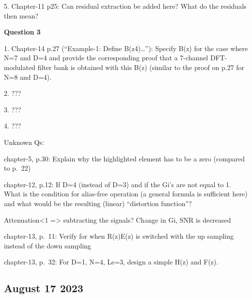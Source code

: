 \documentclass[
  a4paper,
  ,captions=tableheading
]{scrartcl}
\begin{document}
5. Chapter-11 p25: Can residual extraction be added here? What do the
residuals then mean?

\textbf{Question 3}

1. Chapter-14 p.27 (``Example-1: Define B(z4)\ldots''): Specify B(z) for
the case where N=7 and D=4 and provide the corresponding proof that a
7-channel DFT-modulated filter bank is obtained with this B(z) (similar
to the proof on p.27 for N=8 and D=4).

2. ???

3. ???

4. ???

Unknown Qs:

chapter-5, p.30: Explain why the highlighted element has to be a zero
(compared to p.~22)

chapter-12, p.12: If D=4 (instead of D=3) and if the Gi's are not equal
to 1. What is the condition for alias-free operation (a general formula
is sufficient here) and what would be the resulting (linear)
``distortion function''?

Attenuation\textless1 =\textgreater{} subtracting the signals? Change in
Gi, SNR is decreased

chapter-13, p.~11: Verify for when R(z)E(z) is switched with the up
sampling instead of the down sampling

chapter-13, p.~32: For D=1, N=4, Le=3, design a simple H(z) and F(z).

\subsection{August 17 2023}\label{august-17-2023}
\end{document}
